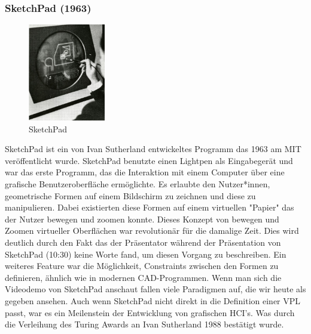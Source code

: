 \documentclass[ngerman]{article}
\begin{document}
\subsubsection{SketchPad (1963)}
\label{sec:SketchPad}
\begingroup
\setlength\intextsep{2pt}
\begin{minipage}{\linewidth}
\begin{figure}
  \centering
  \includegraphics[width=0.3\textwidth]{./graphics/sketchpad-sutherland.jpg} %
  \caption{SketchPad \cite{sutherlandSketchpad}}
  \label{fig:your_label}
\end{figure}
SketchPad ist ein von Ivan Sutherland entwickeltes Programm das 1963 am MIT veröffentlicht wurde. 
SketchPad benutzte einen Lightpen als Eingabegerät und war das erste Programm, das die Interaktion mit einem Computer über eine grafische Benutzeroberfläche ermöglichte. 
Es erlaubte den Nutzer*innen, geometrische Formen auf einem Bildschirm zu zeichnen und diese zu manipulieren.
Dabei existierten diese Formen auf einem virtuellen "Papier" das der Nutzer bewegen und zoomen konnte. Dieses Konzept von bewegen und Zoomen virtueller Oberflächen war revolutionär für die damalige Zeit.
  Dies wird deutlich durch den Fakt das der Präsentator während der Präsentation von SketchPad \cite{sketchpadDemo} (10:30) keine Worte fand, um diesen Vorgang zu beschreiben.
Ein weiteres Feature war die Möglichkeit, Constraints zwischen den Formen zu definieren, ähnlich wie in modernen CAD-Programmen. 
Wenn man sich die Videodemo von SketchPad anschaut fallen viele Paradigmen auf, die wir heute als gegeben ansehen.
\linebreak
\linebreak
Auch wenn SketchPad nicht direkt in die Definition einer VPL passt, war es ein Meilenstein der Entwicklung von grafischen HCI's. Was durch die Verleihung des Turing Awards an Ivan Sutherland 1988 bestätigt wurde.
\end{minipage}
\endgroup
\end{document}
